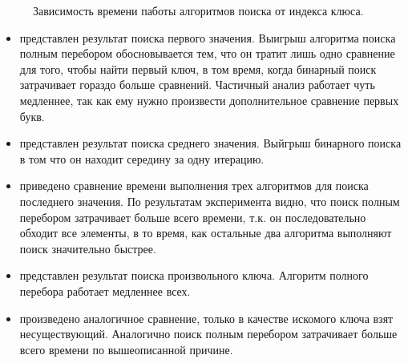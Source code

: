 \documentclass[12pt,a4paper]{report}
\begin{document}
\begin{figure}[ht!]
	\caption{Зависимость времени паботы алгоритмов поиска от индекса клюса.}
\end{figure}


\newpage
\begin{itemize}
	\item представлен результат поиска первого значения.
	Выигрыш алгоритма поиска полным перебором обосновывается тем, что он тратит
	лишь одно сравнение для того, чтобы найти первый ключ, в том время, когда
	бинарный поиск затрачивает гораздо больше сравнений.
	Частичный анализ работает чуть медленнее, так как ему нужно
	произвести дополнительное сравнение первых букв.
	\item представлен результат поиска среднего значения. Выйгрыш бинарного поиска в том что он находит середину за одну итерацию.
	\item приведено сравнение времени выполнения
	трех алгоритмов для поиска последнего значения.
	По результатам эксперимента видно, что поиск полным перебором
	затрачивает больше всего времени, т.к. он последовательно обходит
	все элементы, в то время, как остальные два алгоритма выполняют
	поиск значительно быстрее.
	\item представлен результат поиска произвольного ключа.
	Алгоритм полного перебора работает медленнее всех.
	\item произведено аналогичное сравнение, только в качестве искомого ключа
	взят несуществующий. Аналогично поиск полным перебором
	затрачивает больше всего времени по вышеописанной причине.
\end{itemize}
\end{document}
